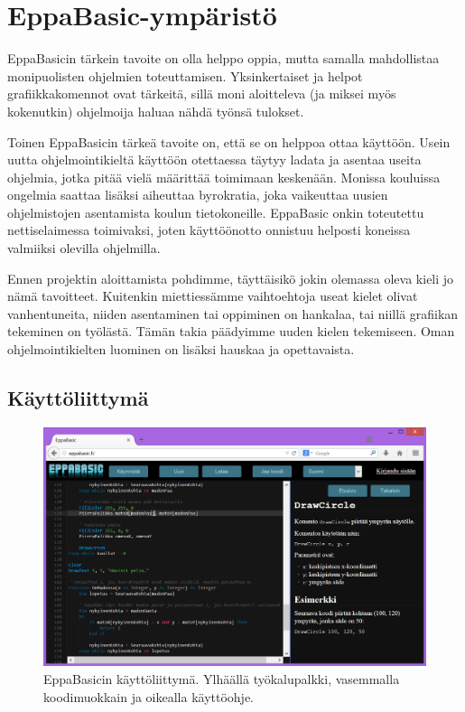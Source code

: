 \section{EppaBasic-ympäristö}
EppaBasicin tärkein tavoite on olla
helppo oppia,
mutta samalla mahdollistaa
monipuolisten ohjelmien toteuttamisen.
Yksinkertaiset ja helpot grafiikkakomennot ovat tärkeitä,
sillä moni aloitteleva (ja miksei myös kokenutkin)
ohjelmoija haluaa nähdä työnsä tulokset.

Toinen EppaBasicin tärkeä tavoite on,
että se on helppoa ottaa käyttöön.
Usein uutta ohjelmointikieltä käyttöön otettaessa
täytyy ladata ja asentaa useita ohjelmia,
jotka pitää vielä määrittää
toimimaan keskenään.
Monissa kouluissa
ongelmia saattaa lisäksi aiheuttaa byrokratia,
joka vaikeuttaa uusien ohjelmistojen asentamista
koulun tietokoneille.
EppaBasic onkin toteutettu
nettiselaimessa toimivaksi, joten
käyttöönotto onnistuu
helposti koneissa valmiiksi
olevilla ohjelmilla.

Ennen projektin aloittamista pohdimme,
täyttäisikö jokin olemassa oleva
kieli jo nämä tavoitteet.
Kuitenkin miettiessämme vaihtoehtoja
useat kielet olivat vanhentuneita,
niiden asentaminen tai oppiminen on hankalaa,
tai niillä grafiikan tekeminen on työlästä.
Tämän takia päädyimme uuden kielen tekemiseen.
Oman ohjelmointikielten luominen on lisäksi hauskaa
ja opettavaista.

\subsection{Käyttöliittymä}
\begin{figure}[h]
    \centering
    \includegraphics[width=1\textwidth]{kayttoliittyma}
    \caption{EppaBasicin käyttöliittymä. Ylhäällä työkalupalkki, vasemmalla koodimuokkain ja oikealla käyttöohje.}
    \label{img:kayttoliittyma}
\end{figure}

